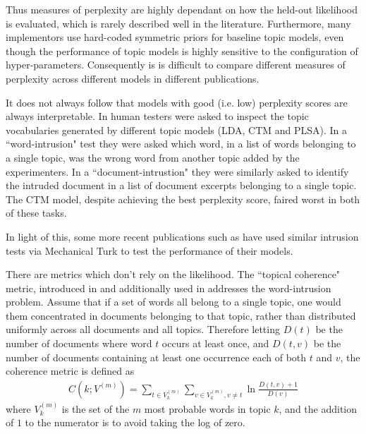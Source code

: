 Thus measures of perplexity are highly dependant on how the held-out likelihood is evaluated, which is rarely described well in the literature. Furthermore, many implementors use hard-coded symmetric priors for baseline topic models, even though the performance of topic models is highly sensitive to the configuration of hyper-parameters\cite{Asuncion2012}\cite{Wallach2006}. Consequently is is difficult to compare different measures of perplexity across different models in different publications.

It does not always follow that models with good (i.e. low) perplexity scores are always interpretable. In\cite{Chang2009} human testers were asked to inspect the topic vocabularies generated by different topic models (LDA, CTM and PLSA). In a ``word-intrusion" test they were asked which word, in a list of words belonging to a single topic, was the wrong word from another topic added by the experimenters. In a ``document-intrustion" they were similarly asked to identify the intruded document in a list of document excerpts belonging to a single topic. The CTM model, despite achieving the best perplexity score, faired worst in both of these tasks. 


In light of this, some more recent publications such as \cite{Li2006}\cite{Wang2007}\cite{Lindsey2012} have used similar intrusion tests via Mechanical Turk to test the performance of their models.

There are metrics which don't rely on the likelihood. The ``topical coherence" metric, introduced in \cite{Mimno2011} and additionally used in \cite{Mimno2012a} addresses the word-intrusion problem. Assume that if a set of words all belong to a single topic, one would them concentrated in documents belonging to that topic, rather than distributed uniformly across all documents and all topics. Therefore letting $D(t)$ be the number of documents where word $t$ occurs at least once, and $D(t,v)$ be the number of documents containing at least one occurrence each of both $t$ and $v$, the coherence metric is defined as
\begin{align}
C(k; V^{(m)}) = \sum_{t \in V^{(m)}_k} \sum_{v \in V^{(m)}_k,  v \neq t} \ln \frac{D(t, v) + 1}{D(v)}
\end{align}
where $V^{(m)}_k$ is the set of the $m$ most probable words in topic $k$, and the addition of $1$ to the numerator is to avoid taking the log of zero. 

